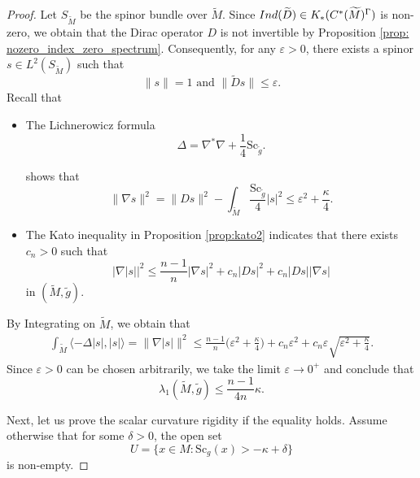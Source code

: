 \documentclass[12pt, reqno]{amsart}
\theoremstyle{plain}%
\theoremstyle{definition}
\theoremstyle{remark}
\numberwithin{equation}{section}
\newcommand{\Sc}{\mathrm{Sc}}
\newcommand{\ind}{\textup{Ind}}
\begin{document}
\begin{proof}
   	Let $S_{\widetilde M}$ be the spinor bundle over $\widetilde M$. Since $\ind(\widetilde D)\in K_*(C^*(\widetilde M)^\Gamma)$ is non-zero, we obtain that the Dirac operator $D$ is not invertible by Proposition \ref{prop: nozero_index_zero_spectrum}.  Consequently, for any $\varepsilon>0$, there exists a spinor $s\in L^2(S_{\widetilde M})$ such that
	$$\|s\|=1 \text{ and }\|\widetilde Ds\|\leq\varepsilon.$$
    Recall that
	\begin{itemize}
		\item  The Lichnerowicz formula \[\Delta = \nabla^*\nabla + \frac{1}{4}\Sc_{\widetilde g}.\]
        
        
        shows that 
		$$\|\nabla s\|^2=\|D s\|^2-\int_{\widetilde M}\frac{\Sc_{\widetilde g}}{4}|s|^2\leq \varepsilon^2+\frac{\kappa}{4}.$$
		
		\item 	The  Kato inequality in Proposition \ref{prop:kato2} indicates that there exists $c_n>0$ such that
		$$\Big|\nabla|s|\Big|^2\leq \frac{n-1}{n}|\nabla s|^2+c_n|D s|^2+c_n|Ds||\nabla s|$$
		in $(\widetilde M, \widetilde {g})$.
	\end{itemize}
    \bigskip
	By Integrating on $\widetilde M$, we obtain that
	\begin{align*}
		\int_{\widetilde M}\langle-\Delta |s|,|s|\rangle=\Big\|\nabla|s|\Big\|^2
		\leq \frac{n-1}{n}\big(\varepsilon^2+\frac{\kappa}{4}\big)+c_n\varepsilon^2+c_n\varepsilon\sqrt{\varepsilon^2+\frac{\kappa}{4}}.
	\end{align*}
 Since $\varepsilon > 0$ can be chosen arbitrarily, we take the limit $\varepsilon \to 0^+$ and conclude that $$\lambda_1(\widetilde M,\widetilde g)\leq \frac{n-1}{4n}\kappa.$$
	
Next, let us prove the scalar curvature rigidity if the equality holds. Assume otherwise that for some $\delta>0$, the open set 
    $$U=\{x\in M:\Sc_g(x)>-\kappa+\delta\}$$
    is non-empty. 
    

\end{proof}
\end{document}
